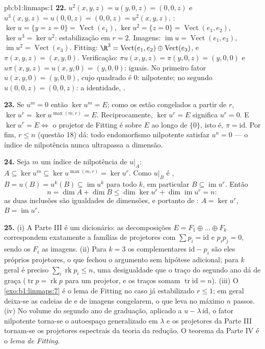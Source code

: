 \begin{solution}{pb:b1:linmaps:1}
\textbf{22.} $u^2(x,y,z) = u(y, 0, z) = (0, 0, z)$ e $u^3(x,y,z) = u(0,0,z) = (0,0,z) = u^2(x,y,z)$. : $\ker u
= \{y = z = 0\} = \operatorname{Vect}(e_1)$, $\ker u^2 = \{z =
0\} = \operatorname{Vect}(e_1, e_2)$, $\ker u^3 = \ker u^2$:
estabilização em $r = 2$. Imagens: $\operatorname{im} u =
\operatorname{Vect}(e_1, e_3)$, $\operatorname{im} u^2 =
\operatorname{Vect}(e_3)$. Fitting: $\R^3 =
\operatorname{Vect}(e_1, e_2) \oplus \operatorname{Vect}(e_3)$,
e $\pi(x, y, z) = (x, y, 0)$. Verificação: $\pi u(x,y,z) = \pi(y, 0,
z) = (y, 0, 0)$ e $u\pi(x,y,z) = u(x, y, 0) = (y, 0, 0)$: iguais. No primeiro fator
$u(x, y, 0) = (y, 0, 0)$, cujo quadrado é $0$: nilpotente; no segundo $u(0,0,z) = (0,0,z)$: a
identidade, .

\textbf{23.} Se $u^m = 0$ então $\ker u^m = E$; como os  estão
congelados a partir de $r$, $\ker u^{r} = \ker u^{\max(m, r)} = E$. Reciprocamente, $\ker u^{r} = E$ significa
$u^{r} = 0$. E $\ker u^{r} =
E \iff$ o projetor de Fitting é sobre $E$ ao longo de
$\{0\}$, isto é, $\pi = \mathrm{id}$. Por fim, $r \leq n$ (questão 18) dá: todo
endomorfismo nilpotente satisfaz $u^{n} = 0$ --- o índice de nilpotência
nunca ultrapassa a dimensão.

\textbf{24.} Seja $m$ um índice de nilpotência de $u|_A$: $A
\subseteq \ker u^{m} \subseteq \ker u^{\max(m,r)} = \ker u^{r}$.
Como $u|_B$ é , $B = u(B) = u^{k}(B) \subseteq
\operatorname{im} u^{k}$ para todo $k$, em particular $B
\subseteq \operatorname{im} u^{r}$.
Então
\[
n = \dim A + \dim B \leq \dim\ker u^{r} +
\dim\operatorname{im} u^{r} = n :
\]
as duas inclusões são igualdades de dimensões, e portanto de
: $A = \ker u^{r}$, $B = \operatorname{im} u^{r}$.

\textbf{25.} (i) A Parte III é um dicionário: as decomposições
$E = F_1
\oplus \dots \oplus F_k$ correspondem exatamente a famílias de projetores com $\sum p_i = \mathrm{id}$ e
$p_i p_j = 0$, sendo os $F_i$ as imagens. (ii) Para $k = 3$ os
complementares $\mathrm{id} - p_i$ são eles próprios projetores, o que fechou o
argumento sem hipótese adicional; para $k$ geral é preciso $\sum_i \operatorname{rk} p_i \leq n$,
uma desigualdade que o traço do segundo ano dá de graça ($\operatorname{tr} p = \operatorname{rk}
p$ para
um projetor, e os traços somam $\operatorname{tr}
\mathrm{id} = n$). (iii) O \cref{exo:b1:linmaps:7} é o lema de
Fitting no caso já estabilizado $r \leq 1$; em geral deixa-se as cadeias
de  e de imagens congelarem, o que leva no máximo $n$
passos. (iv) No volume do segundo ano de graduação, aplicado a
$u - \lambda\,
\mathrm{id}$, o fator nilpotente torna-se o autoespaço generalizado em
$\lambda$ e os projetores da Parte III tornam-se os projetores
espectrais da teoria da redução. O teorema da Parte IV é o
\emph{lema de Fitting}.
\end{solution}
